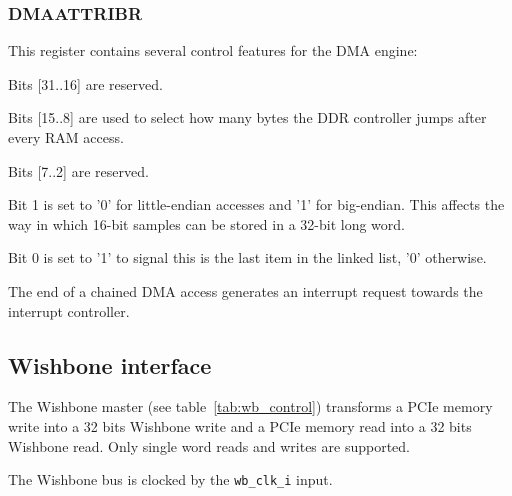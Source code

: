 \documentclass[10pt,a4paper]{cerndoc}
\begin{document}
\subsubsection{DMAATTRIBR}
This register contains several control features for the DMA engine:
\begin{packed_item}
\item Bits [31..16] are reserved.
\item Bits [15..8] are used to select how many bytes the DDR controller jumps after every RAM access. %
\item Bits [7..2] are reserved.
\item Bit 1 is set to '0' for little-endian accesses and '1' for big-endian. This affects the way in which 16-bit samples can be stored in a 32-bit long word.
\item Bit 0 is set to '1' to signal this is the last item in the linked list, '0' otherwise.
\end{packed_item}

The end of a chained DMA access generates an interrupt request towards the interrupt controller.    
    \subsection{Wishbone interface}
    The Wishbone master (see table~\ref{tab:wb_control}) transforms a PCIe memory write into a 32 bits Wishbone write and a PCIe memory read into a 32 bits Wishbone read. Only single word reads and writes are supported.
    
    The Wishbone bus is clocked by the \verb+wb_clk_i+ input.
\end{document}
